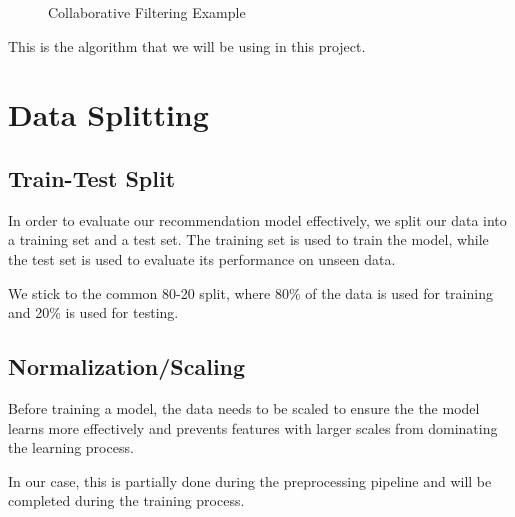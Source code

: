 \begin{figure}[H]
    \centering
    \caption{Collaborative Filtering Example}
    \label{fig:collaborative-filtering-example}
\end{figure}

This is the algorithm that we will be using in this project.

\section{Data Splitting}

\subsection{Train-Test Split}
In order to evaluate our recommendation model effectively, we split our data into a training set and a test set.
The training set is used to train the model, while the test set is used to evaluate its performance on unseen data.

We stick to the common 80-20 split, where 80\% of the data is used for training and 20\% is used for testing.

\subsection{Normalization/Scaling}
Before training a model, the data needs to be scaled to ensure the the model learns more effectively and prevents features with larger scales from dominating the learning process.

In our case, this is partially done during the preprocessing pipeline and will be completed during the training process.

